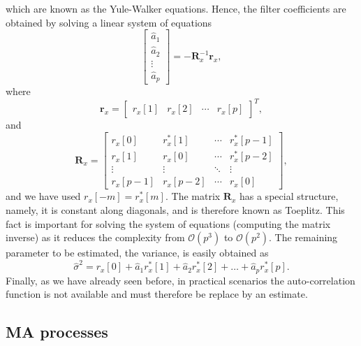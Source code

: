 which are known as the Yule-Walker equations. Hence, the filter coefficients are obtained by solving a linear system of equations
\begin{equation}
\begin{bmatrix}
\hat{a}_1 \\ \hat{a}_2 \\ \vdots \\ \hat{a}_p
\end{bmatrix} = - \mathbf{R}_x^{-1} \mathbf{r}_x,
\end{equation}
where 
\begin{equation}
\mathbf{r}_x = \begin{bmatrix}
r_x[1] & r_x[2] & \cdots & r_x[p]
\end{bmatrix}^T,
\end{equation}
and
\begin{equation}
\mathbf{R}_x  =\begin{bmatrix}
r_x[0] & r_x^{\ast}[1] & \cdots & r_x^{\ast}[p-1] \\
r_x[1] & r_x[0] & \cdots & r_x^{\ast}[p-2] \\
\vdots & \vdots & \ddots & \vdots \\
r_x[p-1] & r_x[p-2] & \cdots & r_x[0] 
\end{bmatrix},
\end{equation}
and we have used $r_{x}[-m] = r_{x}^{\ast}[m]$. The matrix $\mathbf{R}_x$ has a special structure, namely, it is constant along diagonals, and is therefore known as Toeplitz. This fact is important for solving the system of equations (computing the matrix inverse) as it reduces the complexity from $\mathcal{O}(p^3)$ to $\mathcal{O}(p^2)$. The remaining parameter to be estimated, the variance, is easily obtained as
\begin{equation}
\hat{\sigma}^2 = r_x[0] + \hat{a}_1 r_x^{\ast}[1] + \hat{a}_2 r_x^{\ast}[2] + \ldots + \hat{a}_p r_x^{\ast}[p].
\end{equation}
Finally, as we have already seen before, in practical scenarios the auto-correlation function is not available and must therefore be replace by an estimate.

\subsection{MA processes}

